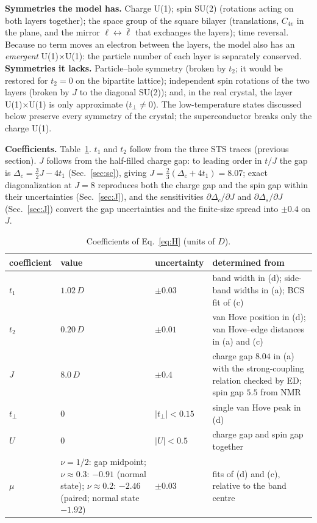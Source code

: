 \documentclass[11pt]{article}
\newcommand{\nuh}{\nu=1/2}
\newcommand{\nut}{\nu\approx0.3}
\newcommand{\nutw}{\nu\approx0.2}
\begin{document}
\textbf{Symmetries the model has.} Charge U(1); spin SU(2) (rotations acting on both layers together); the space group of the square bilayer (translations, $C_{4v}$ in the plane, and the mirror $\ell\leftrightarrow\bar\ell$ that exchanges the layers); time reversal. Because no term moves an electron between the layers, the model also has an \emph{emergent} U(1)$\times$U(1): the particle number of each layer is separately conserved. \textbf{Symmetries it lacks.} Particle--hole symmetry (broken by $t_2$; it would be restored for $t_2=0$ on the bipartite lattice); independent spin rotations of the two layers (broken by $J$ to the diagonal SU(2)); and, in the real crystal, the layer U(1)$\times$U(1) is only approximate ($t_\perp\ne0$). The low-temperature states discussed below preserve every symmetry of the crystal; the superconductor breaks only the charge U(1).

\textbf{Coefficients.} Table~\ref{tab:coef}. $t_1$ and $t_2$ follow from the three STS traces (previous section). $J$ follows from the half-filled charge gap: to leading order in $t/J$ the gap is $\Delta_c=\tfrac32J-4t_1$ (Sec.~\ref{sec:sc}), giving $J=\tfrac23(\Delta_c+4t_1)=8.07$; exact diagonalization at $J=8$ reproduces both the charge gap and the spin gap within their uncertainties (Sec.~\ref{sec:J}), and the sensitivities $\partial\Delta_c/\partial J$ and $\partial\Delta_s/\partial J$ (Sec.~\ref{sec:J}) convert the gap uncertainties and the finite-size spread into $\pm0.4$ on $J$.

\begin{table}[h]\centering\footnotesize
\begin{tabular}{p{1.7cm}p{5.0cm}p{2.0cm}p{6.1cm}}\toprule
coefficient & value & uncertainty & determined from \\ \midrule
$t_1$ & $1.02\,D$ & $\pm0.03$ & band width in (d); side-band widths in (a); BCS fit of (c) \\
$t_2$ & $0.20\,D$ & $\pm0.01$ & van Hove position in (d); van Hove--edge distances in (a) and (c) \\
$J$ & $8.0\,D$ & $\pm0.4$ & charge gap $8.04$ in (a) with the strong-coupling relation checked by ED; spin gap $5.5$ from NMR \\
$t_\perp$ & $0$ & $|t_\perp|<0.15$ & single van Hove peak in (d) \\
$U$ & $0$ & $|U|<0.5$ & charge gap and spin gap together \\
$\mu$ & $\nuh$: gap midpoint; $\nut$: $-0.91$ (normal state); $\nutw$: $-2.46$ (paired; normal state $-1.92$) & $\pm0.03$ & fits of (d) and (c), relative to the band centre \\ \bottomrule
\end{tabular}
\caption{Coefficients of Eq.~\eqref{eq:H} (units of $D$).}\label{tab:coef}\end{table}
\end{document}
